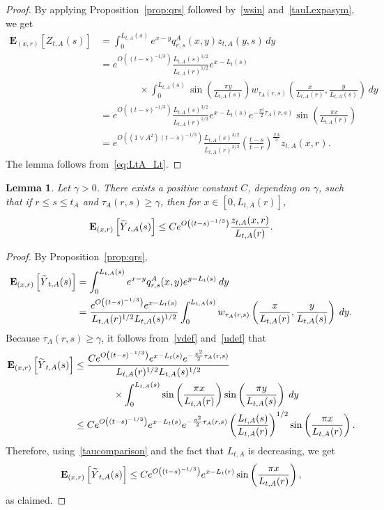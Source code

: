 \documentclass[10pt]{amsart}
\newtheorem{lemm}[theo]{Lemma}\newtheorem{prop}[theo]{Proposition}\newtheorem{coro}[theo]{Corollary}\newtheorem{conj}[theo]{Conjecture}
\theoremstyle{definition}\newtheorem{defi}[theo]{Definition}\newtheorem{rema}[theo]{Remark}\newtheorem{exam}[theo]{Example}\newtheorem{exem}[theo]{Example}\newtheorem{nota}[theo]{Notation}
\newcommand*\E{\mathbf{E}}
\newcommand{\1} {\mathds{1}}
\let\oldtilde\tilde
\renewcommand*{\tilde}[1]{\mathchoice{\widetilde{#1}}{\widetilde{#1}}{\oldtilde{#1}}{\oldtilde{#1}}}
\begin{document}
\begin{proof}
By applying Proposition~\ref{prop:qrs} followed by~\eqref{wsin} and~\eqref{tauLexpasym}, we get
\begin{align*}
\E_{(x,r)}\left[Z_{t,A}(s)\right] &= \int_0^{L_{t,A}(s)} e^{x-y} q_{r,s}^A(x,y) z_{t,A}(y,s)\,dy\\
&=e^{O\left((t - s)^{-1/3}\right)} \frac{L_{t,A}(s)^{1/2}}{L_{t,A}(r)^{1/2}} e^{x-L_t(s)} \\
&\qquad \qquad \times \int_0^{L_{t,A}(s)} \sin\left(\frac{\pi y}{L_{t,A}(s)} \right) w_{\tau_A(r,s)} \left(\frac{x}{L_{t,A}(r)}, \frac{y}{L_{t,A}(s)} \right)\,dy \\
&=e^{O\left((t - s)^{-1/3}\right)} \frac{L_{t,A}(s)^{3/2}}{L_{t,A}(r)^{1/2}} e^{x-L_t(s)} e^{-\frac{\pi^2}2\tau_A(r,s)}\sin\left(\frac{\pi x}{L_{t,A}(r)} \right) \\
&=e^{O\left(\left(1 \vee A^2\right)(t - s)^{-1/3}\right)} \frac{L_{t,A}(s)^{3/2}}{L_{t,A}(r)^{3/2}} \left(\frac{t - s}{t-r} \right)^{\frac{2A} 3} z_{t,A}(x,r).
\end{align*}
The lemma follows from~\eqref{eq:LtA_Lt}.
\end{proof}

\begin{lemm}\label{lem:Yexp}
Let $\gamma > 0$. There exists a positive constant $C$, depending on $\gamma$, such that if $r\le s\le t_A$ and $\tau_A(r,s) \geq \gamma$, then for $x\in[0,L_{t,A}(r)]$,
\[
\E_{(x,r)}\left[{\tilde Y}_{t,A}(s)\right] \leq C e^{O\left((t - s)^{-1/3}\right)} \frac{z_{t,A}(x,r)}{L_{t,A}(r)}.
\]
\end{lemm}

\begin{proof}
By Proposition~\ref{prop:qrs},
\begin{align*}
\E_{(x,r)}\left[{\tilde Y}_{t,A}(s)\right] &= \int_0^{L_{t,A}(s)} e^{x-y} q^A_{r,s}(x,y) e^{y - L_t(s)} \: dy \\
&= \frac{e^{O\left((t - s)^{-1/3}\right)} e^{x - L_t(s)}}{L_{t,A}(r)^{1/2} L_{t,A}(s)^{1/2}} \int_0^{L_{t,A}(s)} w_{\tau_A(r,s)} \left(\frac{x}{L_{t,A}(r)}, \frac{y}{L_{t,A}(s)} \right) \: dy.
\end{align*}
Because $\tau_A(r,s) \geq \gamma$, it follows from~\eqref{vdef} and~\eqref{udef} that
\begin{align*}
\E_{(x,r)}\left[{\tilde Y}_{t,A}(s)\right] &\leq \frac{C e^{O\left((t - s)^{-1/3}\right)}e^{x - L_t(s)} e^{-\frac{\pi^2}{2} \tau_A(r,s)}}{L_{t,A}(r)^{1/2} L_{t,A}(s)^{1/2}} \\
&\qquad \qquad \times \int_0^{L_{t,A}(s)} \sin \left(\frac{\pi x}{L_{t,A}(r)} \right) \sin \left(\frac{\pi y}{L_{t,A}(s)} \right) \: dy \\
&\leq C e^{O\left((t - s)^{-1/3}\right)}e^{x - L_t(s)} e^{-\frac{\pi^2}{2} \tau_A(r,s)} \left(\frac{L_{t,A}(s)}{L_{t,A}(r)} \right)^{1/2} \sin \left(\frac{\pi x}{L_{t,A}(r)}\right).
\end{align*}
Therefore, using~\eqref{taucomparison} and the fact that $L_{t,A}$ is decreasing, we get
\[
\E_{(x,r)}\left[{\tilde Y}_{t,A}(s)\right] \leq C e^{O\left((t - s)^{-1/3}\right)} e^{x - L_t(r)} \sin \left(\frac{\pi x}{L_{t,A}(r)} \right),
\]
as claimed.
\end{proof}
\end{document}
